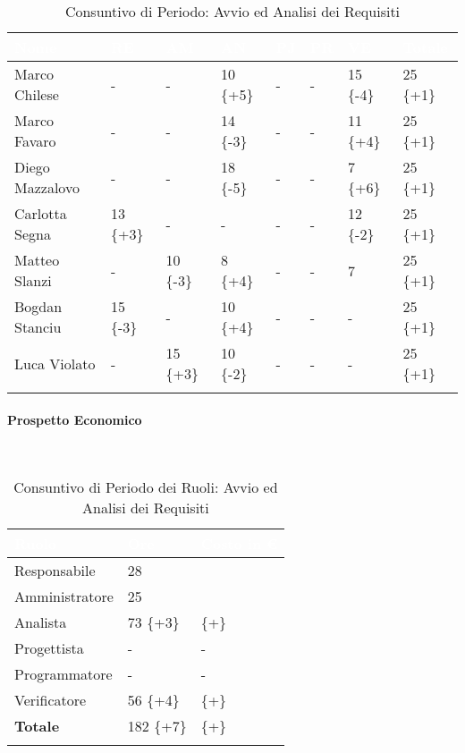 \begin{longtable}{|C{.30\textwidth}|C{.06\textwidth}|C{.06\textwidth}|C{.06\textwidth} | C{.06\textwidth}| C{.06\textwidth} | C{.06\textwidth} | C{.10\textwidth} |}
\hline
{}	\textbf{\textcolor{white}{Nome}} & \textbf{\textcolor{white}{RE}} & \textbf{\textcolor{white}{AM}} & \textbf{\textcolor{white}{AN}} & \textbf{\textcolor{white}{PJ}} & \textbf{\textcolor{white}{PR}} & \textbf{\textcolor{white}{VE}} & \textbf{\textcolor{white}{Totale}}\\
\hline 
Marco Chilese & - & - & 10 \{+5\} & - & - & 15 \{-4\} & 25 \{+1\} \\
\hline
{}Marco Favaro & - & - & 14 \{-3\} & - & - & 11 \{+4\} & 25 \{+1\} \\
\hline
Diego Mazzalovo & - & - & 18 \{-5\} & - & - & 7 \{+6\} & 25 \{+1\} \\
\hline
{}Carlotta Segna & 13 \{+3\} & - & - & - & - & 12 \{-2\} & 25 \{+1\} \\
\hline
Matteo Slanzi & - & 10 \{-3\} & 8 \{+4\} & - & - & 7 & 25 \{+1\} \\
\hline
{}Bogdan Stanciu & 15 \{-3\} & - & 10 \{+4\} & - & - & - & 25 \{+1\}\\
\hline
Luca Violato & - & 15 \{+3\} & 10 \{-2\} & - & - & - & 25 \{+1\} \\
\hline


\caption{Consuntivo di Periodo: Avvio ed Analisi dei Requisiti}
\label{tab:cfp_aar}
\end{longtable}

\paragraph{Prospetto Economico} \-\\

\begin{longtable}{| C{.30\textwidth}| C{.15\textwidth}| C{.20\textwidth}|}
\hline
{}\textbf{\textcolor{white}{Ruolo}} & \textbf{\textcolor{white}{Ore}} & \textbf{\textcolor{white}{Costo in \euro}} \\
\hline
Responsabile & 28 &  \\
\hline
{}Amministratore & 25 &  \\
\hline
Analista & 73 \{+3\} &  \{+\}\\
\hline
{}Progettista & - & - \\
\hline
Programmatore & - & - \\
\hline
{}Verificatore & 56 \{+4\} &  \{+\}\\
\hline
\textbf{Totale} & 182 \{+7\}&  \{+\}\\
\hline
\caption{Consuntivo di Periodo dei Ruoli: Avvio ed Analisi dei Requisiti}
\label{tab:doaar}
\end{longtable}


